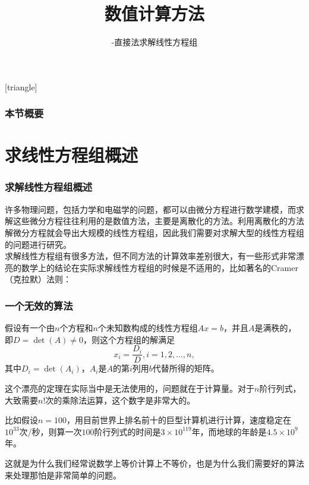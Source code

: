\documentclass[10pt]{beamer}
\title[数值计算方法]{数值计算方法}
\subtitle{-直接法求解线性方程组}
\begin{document}
[triangle]

\begin{frame}
\titlepage
\end{frame}


\begin{frame}
  \frametitle{本节概要}
  \tableofcontents%
\end{frame}

\section{求线性方程组概述}

\begin{frame}
\frametitle{求解线性方程组概述}
许多物理问题，包括力学和电磁学的问题，都可以由微分方程进行数学建模，而求解这些微分方程往往利用的是数值方法，主要是离散化的方法。利用离散化的方法解微分方程就会导出大规模的线性方程组，因此我们需要对求解大型的线性方程组的问题进行研究。\\
\vspace{0.2cm}
求解线性方程组有很多方法，但不同方法的计算效率差别很大，有一些形式非常漂亮的数学上的结论在实际求解线性方程组的时候是不适用的，比如著名的Cramer（克拉默）法则：


\end{frame}


\begin{frame}
\frametitle{一个无效的算法}
\begin{theorem}[Cramer法则]
假设有一个由$n$个方程和$n$个未知数构成的线性方程组$Ax = b$，并且$A$是满秩的，即$D = \det (A) \neq 0$，则这个方程组的解满足
\begin{equation}
x_i = \frac{D_i}{D}, i = 1,2, \ldots, n,
\end{equation}
其中$D_i = \det (A_i)$，$A_i$是$A$的第$i$列用$b$代替所得的矩阵。
\end{theorem}

这个漂亮的定理在实际当中是无法使用的，问题就在于计算量。对于$n$阶行列式，大致需要$n!$次的乘除法运算，这个数字是非常大的。

比如假设$n = 100$，用目前世界上排名前十的巨型计算机进行计算，速度稳定在$10^{33}$次/秒，则算一次$100$阶行列式的时间是$3\times10^{119}$年，而地球的年龄是$4.5\times 10^9$年。

这就是为什么我们经常说数学上等价计算上不等价，也是为什么我们需要好的算法来处理那怕是非常简单的问题。
\end{frame}
\end{document}
